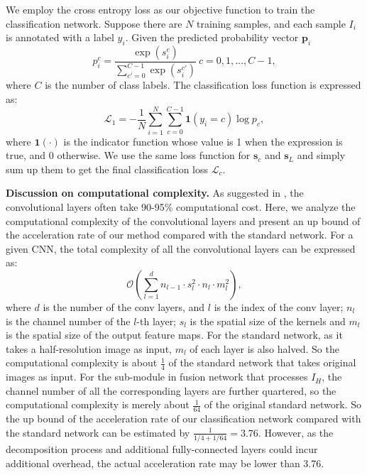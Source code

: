 \documentclass[letterpaper]{article} %
\begin{document}
We employ the cross entropy loss as our objective function to train the classification network. Suppose there are $N$ training samples, and each sample $I_i$ is annotated with a label $y_i$.
Given the predicted probability vector $\mathbf{p}_i$
 \begin{equation}
      p_{i}^c= \frac{\exp(s_{i}^c)}{\sum_{c'=0}^{C-1}\exp(s_{i}^{c'})} \ c=0,1,\dots,C-1,
\end{equation}
where $C$ is the number of class labels. The classification loss function is expressed as:
 \begin{equation}
      \mathcal{L}_{{1}}=-\frac{1}{N}\sum_{i=1}^N\sum_{c=0}^{C-1}\mathbf{1}(y_i=c)\log{p_c},
\end{equation}
where $\mathbf{1}(\cdot)$ is the indicator function whose value is 1 when the expression is true, and 0 otherwise. We use the same loss function for $\mathbf{s}_c$ and $\mathbf{s}_L$ and simply sum up them to get the final classification loss $\mathcal{L}_c$.

\noindent\textbf{Discussion on computational complexity. } As suggested in \cite{he2015convolutional}, the convolutional layers often take 90-95\% computational cost. Here, we analyze the computational complexity of the convolutional layers and present an up bound of the acceleration rate of our method compared with the standard network. For a given CNN, the total complexity of all the convolutional layers can be expressed as:
\begin{equation}
   \mathcal{O}(\sum_{l=1}^{d}n_{l-1} \cdot s_l^2 \cdot n_l \cdot m_l^2),
\end{equation}
where $d$ is the number of the conv layers, and $l$ is the index of the conv layer; $n_l$ is the channel number of the $l$-th layer; $s_l$ is the spatial size of the kernels and $m_l$ is the spatial size of the output feature maps. For the standard network, as it takes a half-resolution image as input, $m_l$ of each layer is also halved. So the computational complexity is about $\frac{1}{4}$ of the standard network that takes original images as input. For the sub-module in fusion network that processes $I_H$, the channel number of all the corresponding layers are further quartered, so the computational complexity is merely about $\frac{1}{64}$ of the original standard network. So the up bound of the acceleration rate of our classification network compared with the standard network can be estimated by $\frac{1} {1/4 + 1/64}=3.76$. However, as the decomposition process and additional fully-connected layers could incur additional overhead, the actual acceleration rate may be lower than 3.76.
\end{document}
